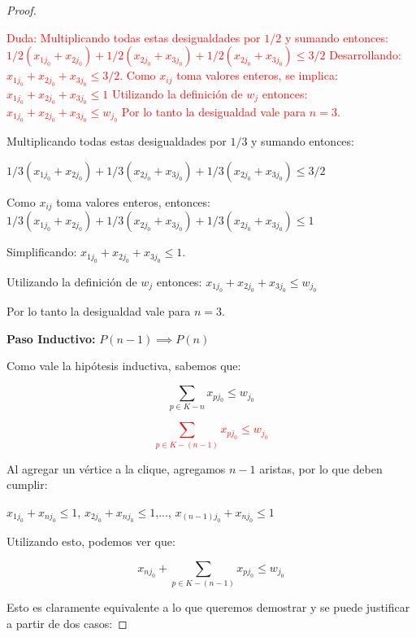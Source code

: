 \begin{proof}
\begin{enumerate}
\textcolor{red}{Duda:
Multiplicando todas estas desigualdades por $1/2$ y sumando entonces:
$1/2 (x_{1j_0} + x_{2j_0})  + 1/2 (x_{2j_0} + x_{3j_0}) + 1/2 (x_{2j_0} + x_{3j_0}) \leq 3/2$
Desarrollando: $x_{1j_0} + x_{2j_0} +  x_{3j_0} \leq 3/2$.
Como $x_{ij}$ toma valores enteros, se implica:
$x_{1j_0} + x_{2j_0} +  x_{3j_0} \leq 1$
Utilizando la definición de $w_j$ entonces: $x_{1j_0} + x_{2j_0} +  x_{3j_0} \leq w_{j_0}$
Por lo tanto la desigualdad vale para $n=3$.
}

Multiplicando todas estas desigualdades por $1/3$ y sumando entonces:

$1/3 (x_{1j_0} + x_{2j_0})  + 1/3 (x_{2j_0} + x_{3j_0}) + 1/3 (x_{2j_0} + x_{3j_0}) \leq 3/2$

Como $x_{ij}$ toma valores enteros, entonces:
$1/3 (x_{1j_0} + x_{2j_0})  + 1/3 (x_{2j_0} + x_{3j_0}) + 1/3 (x_{2j_0} + x_{3j_0}) \leq 1$

Simplificando: $x_{1j_0} + x_{2j_0} +  x_{3j_0} \leq 1$.

Utilizando la definición de $w_j$ entonces: $x_{1j_0} + x_{2j_0} +  x_{3j_0} \leq w_{j_0}$

Por lo tanto la desigualdad vale para $n=3$.

\end{enumerate}

\hfill

\textbf{Paso Inductivo:} $P(n-1) \implies P(n)$

Como vale la hipótesis inductiva, sabemos que:

\begin{equation*}
\sum_{p \in K-n} x_{pj_0} \leq w_{j_0}
\end{equation*}

\textcolor{red}{
\begin{equation*}
\sum_{p \in K-(n-1)} x_{pj_0} \leq w_{j_0}
\end{equation*}
}

Al agregar un vértice a la clique, agregamos $n-1$ aristas, por lo que deben cumplir:

$x_{1j_0} + x_{nj_0} \leq 1$, $x_{2j_0} + x_{nj_0} \leq 1$,...,
$x_{(n-1)j_0} + x_{nj_0} \leq 1$

Utilizando esto, podemos ver que:

\begin{equation*}
x_{nj_0} + \sum_{p \in K-(n-1)} x_{pj_0} \leq w_{j_0}
\end{equation*}

Esto es claramente equivalente a lo que queremos demostrar y se puede justificar a partir de dos casos:


\end{proof}
